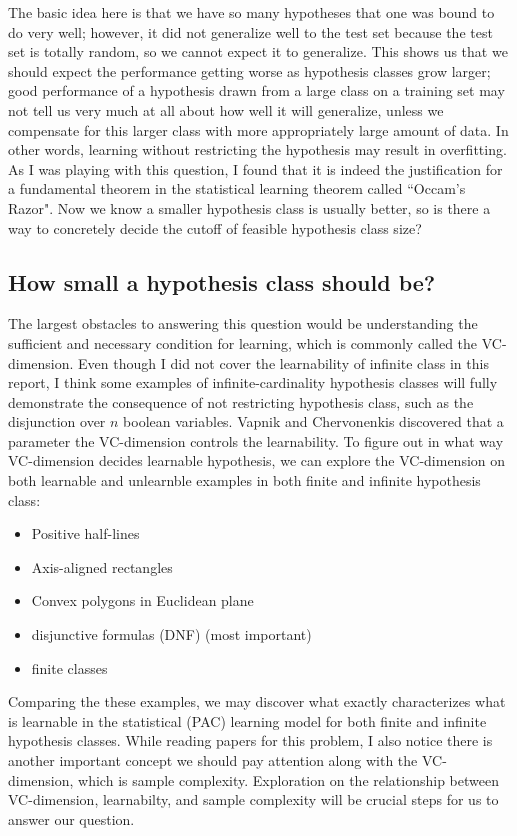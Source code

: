The basic idea here is that we have so many hypotheses that one was bound to do very well; however, it did not generalize well to the test set because the test set is totally random, so we cannot expect it to generalize. This shows us that we should expect the performance getting worse as hypothesis classes grow larger; good performance of a hypothesis drawn from a large class on a training set may not tell us very much at all about how well it will generalize, unless we compensate for this larger class with more appropriately large amount of data. In other words, learning without restricting the hypothesis may result in overfitting.\\

As I was playing with this question, I found that it is indeed the justification for a fundamental theorem in the statistical learning theorem called ``Occam’s Razor". Now we know a smaller hypothesis class is usually better, so is there a way to concretely decide the cutoff of feasible hypothesis class size? 

\subsection{How small a hypothesis class should be?}
The largest obstacles to answering this question would be understanding the sufficient and necessary condition for learning, which is commonly called the VC-dimension. Even though I did not cover the learnability of infinite class in this report, I think some examples of infinite-cardinality hypothesis classes will fully demonstrate the consequence of not restricting hypothesis class, such as the disjunction over $n$ boolean variables. Vapnik and Chervonenkis discovered that a parameter the VC-dimension controls the learnability. To figure out in what way VC-dimension decides learnable hypothesis, we can explore the 
VC-dimension on both learnable and unlearnble examples in both finite and infinite hypothesis class:
\begin{itemize}
    \item Positive half-lines
    \item Axis-aligned rectangles
    \item Convex polygons in Euclidean plane
    \item disjunctive formulas (DNF) (most important)
    \item finite classes
\end{itemize}
Comparing the these examples, we may discover what exactly characterizes what is learnable in the statistical (PAC) learning model for both finite and infinite hypothesis classes. While reading papers for this problem, I also notice there is another important concept we should pay attention along with the VC-dimension, which is sample complexity. Exploration on the relationship between VC-dimension, learnabilty, and sample complexity will be crucial steps for us to answer our question. 